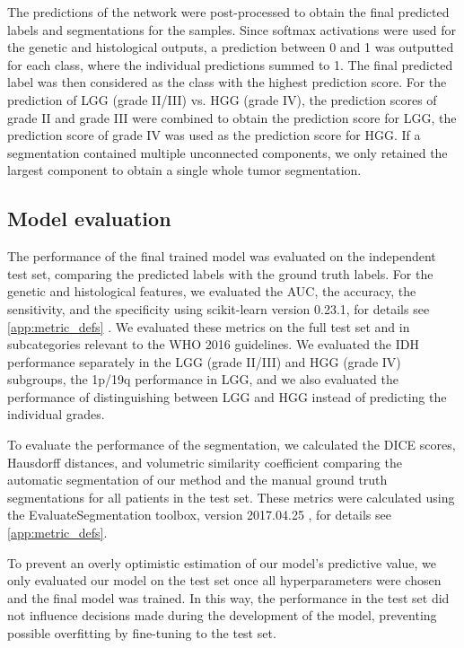 The predictions of the network were post-processed to obtain the final predicted labels and segmentations for the samples.
Since softmax activations were used for the genetic and histological outputs, a prediction between 0 and 1 was outputted for each class, where the individual predictions summed to 1.
The final predicted label was then considered as the class with the highest prediction score.
For the prediction of \gls{LGG} (grade II/III) vs. \gls{HGG} (grade IV), the prediction scores of grade II and grade III were combined to obtain the prediction score for \gls{LGG}, the prediction score of grade IV was used as the prediction score for \gls{HGG}.
If a segmentation contained multiple unconnected components, we only retained the largest component to obtain a single whole \gls{tumor} segmentation.

\subsection{Model evaluation}

The performance of the final trained model was evaluated on the independent test set, comparing the predicted labels with the ground truth labels.
For the genetic and histological features, we evaluated the \gls{AUC}, the accuracy, the sensitivity, and the specificity using scikit-learn version 0.23.1, for details see \cref{app:metric_defs} \autocite{pedregosa2011scikit}.
We evaluated these metrics on the full test set and in subcategories relevant to the \gls{WHO} 2016 guidelines.
We evaluated the \gls{IDH} performance separately in the \gls{LGG} (grade II/III) and \gls{HGG} (grade IV) subgroups, the 1p/19q performance in \gls{LGG}, and we also evaluated the performance of distinguishing between \gls{LGG} and \gls{HGG} instead of predicting the individual grades.

To evaluate the performance of the segmentation, we calculated the DICE scores, Hausdorff distances, and volumetric similarity coefficient comparing the automatic segmentation of our method and the manual ground truth segmentations for all patients in the test set.
These metrics were calculated using the EvaluateSegmentation toolbox, version 2017.04.25 \autocite{taha2015metrics}, for details see \cref{app:metric_defs}.


To prevent an overly optimistic estimation of our model's predictive value, we only evaluated our model on the test set once all hyperparameters were chosen and the final model was trained.
In this way, the performance in the test set did not influence decisions made during the development of the model, preventing possible overfitting by fine-tuning to the test set.

